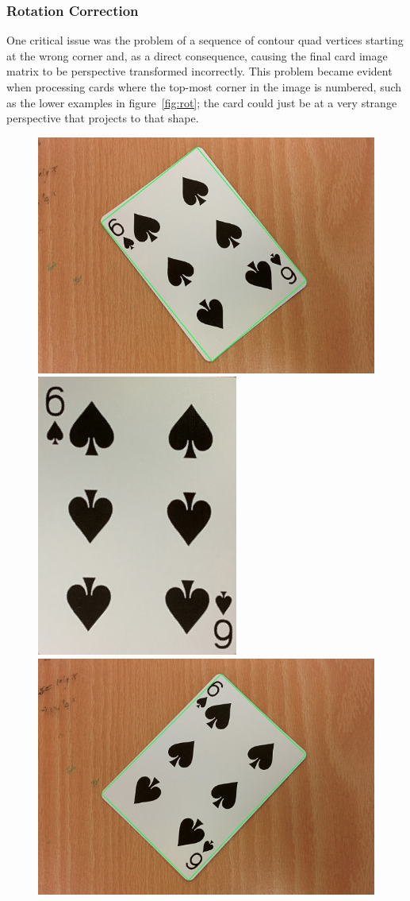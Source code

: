 \documentclass[a4paper,12pt,notitlepage]{article}
\begin{document}
		\subsubsection{Rotation Correction}
			One critical issue was the problem of a sequence of contour quad vertices starting at the wrong corner and, as a direct consequence, causing the final card image matrix to be perspective transformed incorrectly. This problem became evident when processing cards where the top-most corner in the image is numbered, such as the lower examples in figure~\ref{fig:rot}; the card could just be at a very strange perspective that projects to that shape.

			\begin{figure}[H]
				\centering
				\includegraphics[width=0.6\linewidth]{rot1}
				\includegraphics[width=0.3\linewidth]{rot2}\\[5px]
				\includegraphics[width=0.6\linewidth]{rot3}

\end{figure}
\end{document}
